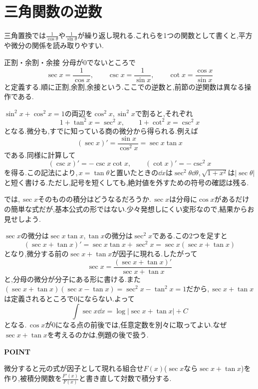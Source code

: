 \section{三角関数の逆数}\label{節:相反三角関数}

三角置換では$\frac1{\cos\theta}$や$\frac1{\sin\theta}$が繰り返し現れる.これらを1つの関数として書くと,平方や微分の関係を読み取りやすい.
\begin{definition}{正割・余割・余接}
分母が$0$でないところで
\[
\sec x=\frac1{\cos x},\qquad
\csc x=\frac1{\sin x},\qquad
\cot x=\frac{\cos x}{\sin x}
\]
と定義する.順に正割,余割,余接という.ここでの逆数と,前節の逆関数は異なる操作である.
\end{definition}

$\sin^2x+\cos^2x=1$の両辺を$\cos^2x$,\,$\sin^2x$で割ると,それぞれ
\[
1+\tan^2x=\sec^2x,\qquad
1+\cot^2x=\csc^2x
\]
となる.微分も,すでに知っている商の微分から得られる.例えば
\[
(\sec x)'=\frac{\sin x}{\cos^2x}=\sec x\tan x
\]
である.同様に計算して
\begin{equation}\label{式:相反三角関数の微分}
(\csc x)'=-\csc x\cot x,\qquad
(\cot x)'=-\csc^2x
\end{equation}
を得る.この記法により,\,$x=\tan\theta$と置いたときの$\dd x$は$\sec^2\theta\dd\theta$,\,$\sqrt{1+x^2}$は$|\sec\theta|$と短く書ける.ただし,記号を短くしても,絶対値を外すための符号の確認は残る.

では,\,$\sec x$そのものの積分はどうなるだろうか.\,$\sec x$は分母に$\cos x$があるだけの簡単な式だが,基本公式の形ではない.少々発想しにくい変形なので,結果からお見せしよう.

$\sec x$の微分は$\sec x\tan x$,\,$\tan x$の微分は$\sec^2x$である.この2つを足すと
\[
(\sec x+\tan x)'=\sec x\tan x+\sec^2x=\sec x(\sec x+\tan x)
\]
となり,微分する前の$\sec x+\tan x$が因子に現れる.したがって
\[
\sec x=\frac{(\sec x+\tan x)'}{\sec x+\tan x}
\]
と,分母の微分が分子にある形に書ける.また$(\sec x+\tan x)(\sec x-\tan x)=\sec^2x-\tan^2x=1$だから,\,$\sec x+\tan x$は定義されるところで$0$にならない.よって
\[
\int\sec x\dd x=\log|\sec x+\tan x|+C
\]
となる.\,$\cos x$が$0$になる点の前後では,任意定数を別々に取ってよい.なぜ$\sec x+\tan x$を考えるのかは,例題の後で扱う.

\begin{bookpoint}
\textbf{POINT}\par
微分すると元の式が因子として現れる組合せ$F(x)$($\sec x$なら$\sec x+\tan x$)を作り,被積分関数を$\frac{F'(x)}{F(x)}$と書き直して対数で積分する.
\end{bookpoint}

